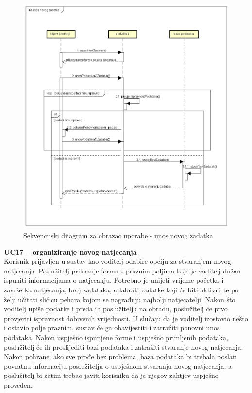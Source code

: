 				\begin{figure}[H]
					\includegraphics[scale=0.6]{dijagrami/sd15.png} 
					\centering
					\caption{Sekvencijski dijagram za obrazac uporabe - unos novog zadatka}
					\label{fig:sekvencijski1}
				\end{figure}
				\pagebreak
				
				\noindent \textbf{UC17 – organiziranje novog natjecanja}\\
				
				\noindent Korisnik prijavljen u sustav kao voditelj odabire opciju za stvaranjem novog natjecanja. Poslužitelj prikazuje formu s praznim poljima koje je voditelj dužan ispuniti informacijama o natjecanju. Potrebno je unijeti vrijeme početka i završetka natjecanja, broj zadataka, odabrati zadatke koji će biti aktivni te po želji učitati sličicu pehara kojom se nagrađuju najbolji natjecatelji. Nakon što voditelj upiše podatke i preda ih poslužitelju na obradu, poslužitelj će prvo provjeriti ispravnost dobivenih vrijednosti. U slučaju da je voditelj izostavio nešto i ostavio polje praznim, sustav će ga obavijestiti i zatražiti ponovni unos podataka. Nakon uspješno ispunjene forme i uspješno primljenih podataka, poslužitelj će ih proslijediti bazi podataka i zatražiti stvaranje novog natjecanja. Nakon pohrane, ako sve prođe bez problema, baza podataka bi trebala poslati povratnu informaciju poslužitelju o uspješnom stvaranju novog natjecanja, a poslužitelj bi zatim trebao javiti korisniku da je njegov zahtjev uspješno proveden.
				
